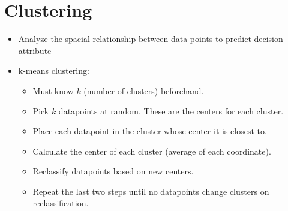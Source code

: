 \documentclass{article}
\begin{document}
\section{Clustering}
\begin{itemize}
	\item Analyze the spacial relationship between data points to predict decision attribute
	\item k-means clustering:
		\begin{itemize}
			\item Must know $k$ (number of clusters) beforehand.
			\item Pick $k$ datapoints at random. These are the centers for each cluster. 
			\item Place each datapoint in the cluster whose center it is closest to.
			\item Calculate the center of each cluster (average of each coordinate).
			\item Reclassify datapoints based on new centers.
			\item Repeat the last two steps until no datapoints change clusters on reclassification.
		\end{itemize}
\end{itemize}
\end{document}
